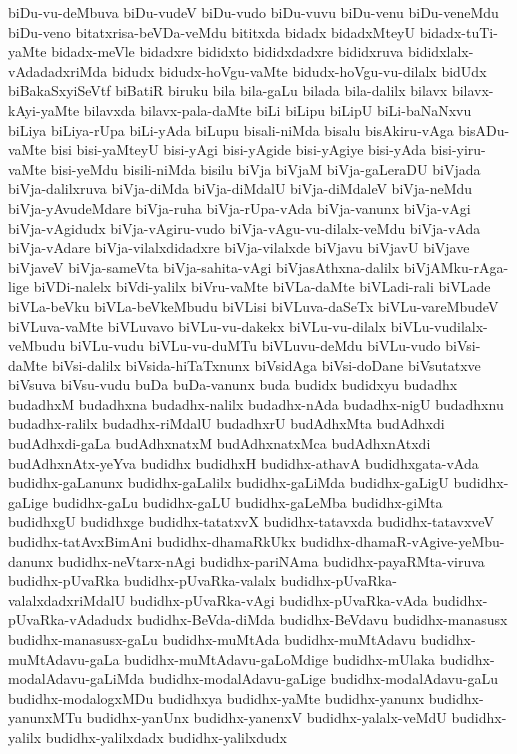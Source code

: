 {biDu-vu-deMbuva
biDu-vudeV
biDu-vudo
biDu-vuvu
biDu-venu
biDu-veneMdu
biDu-veno
bitatxrisa-beVDa-veMdu
bititxda
bidadx
bidadxMteyU
bidadx-tuTi-yaMte
bidadx-meVle
bidadxre
bididxto
bididxdadxre
bididxruva
bididxlalx-vAdadadxriMda
bidudx
bidudx-hoVgu-vaMte
bidudx-hoVgu-vu-dilalx
bidUdx
biBakaSxyiSeVtf
biBatiR
biruku
bila
bila-gaLu
bilada
bila-dalilx
bilavx
bilavx-kAyi-yaMte
bilavxda
bilavx-pala-daMte
biLi
biLipu
biLipU
biLi-baNaNxvu
biLiya
biLiya-rUpa
biLi-yAda
biLupu
bisali-niMda
bisalu
bisAkiru-vAga
bisADu-vaMte
bisi
bisi-yaMteyU
bisi-yAgi
bisi-yAgide
bisi-yAgiye
bisi-yAda
bisi-yiru-vaMte
bisi-yeMdu
bisili-niMda
bisilu
biVja
biVjaM
biVja-gaLeraDU
biVjada
biVja-dalilxruva
biVja-diMda
biVja-diMdalU
biVja-diMdaleV
biVja-neMdu
biVja-yAvudeMdare
biVja-ruha
biVja-rUpa-vAda
biVja-vanunx
biVja-vAgi
biVja-vAgidudx
biVja-vAgiru-vudo
biVja-vAgu-vu-dilalx-veMdu
biVja-vAda
biVja-vAdare
biVja-vilalxdidadxre
biVja-vilalxde
biVjavu
biVjavU
biVjave
biVjaveV
biVja-sameVta
biVja-sahita-vAgi
biVjasAthxna-dalilx
biVjAMku-rAga-lige
biVDi-nalelx
biVdi-yalilx
biVru-vaMte
biVLa-daMte
biVLadi-rali
biVLade
biVLa-beVku
biVLa-beVkeMbudu
biVLisi
biVLuva-daSeTx
biVLu-vareMbudeV
biVLuva-vaMte
biVLuvavo
biVLu-vu-dakekx
biVLu-vu-dilalx
biVLu-vudilalx-veMbudu
biVLu-vudu
biVLu-vu-duMTu
biVLuvu-deMdu
biVLu-vudo
biVsi-daMte
biVsi-dalilx
biVsida-hiTaTxnunx
biVsidAga
biVsi-doDane
biVsutatxve
biVsuva
biVsu-vudu
buDa
buDa-vanunx
buda
budidx
budidxyu
budadhx
budadhxM
budadhxna
budadhx-nalilx
budadhx-nAda
budadhx-nigU
budadhxnu
budadhx-ralilx
budadhx-riMdalU
budadhxrU
budAdhxMta
budAdhxdi
budAdhxdi-gaLa
budAdhxnatxM
budAdhxnatxMca
budAdhxnAtxdi
budAdhxnAtx-yeYva
budidhx
budidhxH
budidhx-athavA
budidhxgata-vAda
budidhx-gaLanunx
budidhx-gaLalilx
budidhx-gaLiMda
budidhx-gaLigU
budidhx-gaLige
budidhx-gaLu
budidhx-gaLU
budidhx-gaLeMba
budidhx-giMta
budidhxgU
budidhxge
budidhx-tatatxvX
budidhx-tatavxda
budidhx-tatavxveV
budidhx-tatAvxBimAni
budidhx-dhamaRkUkx
budidhx-dhamaR-vAgive-yeMbu-danunx
budidhx-neVtarx-nAgi
budidhx-pariNAma
budidhx-payaRMta-viruva
budidhx-pUvaRka
budidhx-pUvaRka-valalx
budidhx-pUvaRka-valalxdadxriMdalU
budidhx-pUvaRka-vAgi
budidhx-pUvaRka-vAda
budidhx-pUvaRka-vAdadudx
budidhx-BeVda-diMda
budidhx-BeVdavu
budidhx-manasusx
budidhx-manasusx-gaLu
budidhx-muMtAda
budidhx-muMtAdavu
budidhx-muMtAdavu-gaLa
budidhx-muMtAdavu-gaLoMdige
budidhx-mUlaka
budidhx-modalAdavu-gaLiMda
budidhx-modalAdavu-gaLige
budidhx-modalAdavu-gaLu
budidhx-modalogxMDu
budidhxya
budidhx-yaMte
budidhx-yanunx
budidhx-yanunxMTu
budidhx-yanUnx
budidhx-yanenxV
budidhx-yalalx-veMdU
budidhx-yalilx
budidhx-yalilxdadx
budidhx-yalilxdudx
}
